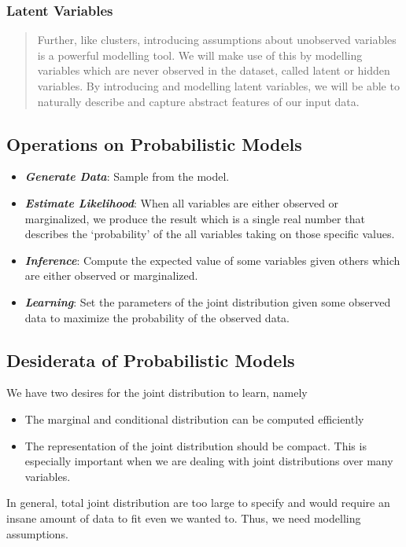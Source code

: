 \documentclass[11pt]{article}
\begin{document}
\subsubsection{Latent Variables} 
\begin{quote}
    Further, like clusters, introducing assumptions about unobserved variables is a powerful modelling tool. We will make use of this by modelling variables which are never observed in the dataset, called latent or hidden variables. By introducing and modelling latent variables, we will be able to naturally describe and capture abstract features of our input data.
\end{quote}

\subsection{Operations on Probabilistic Models}
\begin{itemize}
    \item \textit{\textbf{Generate Data}}: Sample from the model.
    \item \textit{\textbf{Estimate Likelihood}}: When all variables are either observed or marginalized, we produce the result which is a single real number that describes the `probability' of the all variables taking on those specific values.
    \item \textit{\textbf{Inference}}: Compute the expected value of some variables given others which are either observed or marginalized. 
    \item \textit{\textbf{Learning}}: Set the parameters of the joint distribution given some observed data to maximize the probability of the observed data. 
\end{itemize}

\subsection{Desiderata of Probabilistic Models}
We have two desires for the joint distribution to learn, namely
\begin{itemize}
    \item The marginal and conditional distribution can be computed efficiently
    \item The representation of the joint distribution should be compact. This is especially important when we are dealing with joint distributions over many variables.
\end{itemize}
In general, total joint distribution are too large to specify and would require an insane amount of data to fit even we wanted to. Thus, we need modelling assumptions. 
\end{document}
